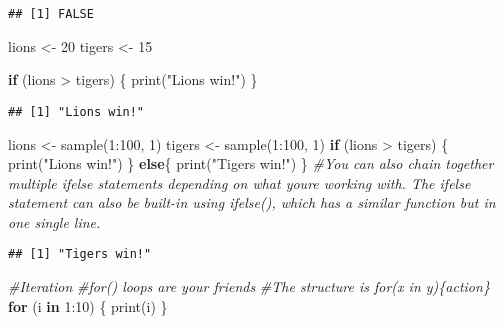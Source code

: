 \documentclass[
]{article}
\newenvironment{Shaded}{\begin{snugshade}}{\end{snugshade}}
\newcommand{\CommentTok}[1]{\textcolor[rgb]{0.56,0.35,0.01}{\textit{#1}}}
\newcommand{\ControlFlowTok}[1]{\textcolor[rgb]{0.13,0.29,0.53}{\textbf{#1}}}
\newcommand{\DecValTok}[1]{\textcolor[rgb]{0.00,0.00,0.81}{#1}}
\newcommand{\FunctionTok}[1]{\textcolor[rgb]{0.00,0.00,0.00}{#1}}
\newcommand{\NormalTok}[1]{#1}
\newcommand{\OtherTok}[1]{\textcolor[rgb]{0.56,0.35,0.01}{#1}}
\newcommand{\SpecialCharTok}[1]{\textcolor[rgb]{0.00,0.00,0.00}{#1}}
\newcommand{\StringTok}[1]{\textcolor[rgb]{0.31,0.60,0.02}{#1}}
\begin{document}
\begin{verbatim}
## [1] FALSE
\end{verbatim}

\begin{Shaded}
\begin{Highlighting}[]
\NormalTok{lions }\OtherTok{\textless{}{-}} \DecValTok{20}
\NormalTok{tigers }\OtherTok{\textless{}{-}} \DecValTok{15}

\ControlFlowTok{if}\NormalTok{ (lions }\SpecialCharTok{\textgreater{}}\NormalTok{ tigers) \{}
  \FunctionTok{print}\NormalTok{(}\StringTok{"Lions win!"}\NormalTok{)}
\NormalTok{\}}
\end{Highlighting}
\end{Shaded}

\begin{verbatim}
## [1] "Lions win!"
\end{verbatim}

\begin{Shaded}
\begin{Highlighting}[]
\NormalTok{lions }\OtherTok{\textless{}{-}} \FunctionTok{sample}\NormalTok{(}\DecValTok{1}\SpecialCharTok{:}\DecValTok{100}\NormalTok{, }\DecValTok{1}\NormalTok{)}
\NormalTok{tigers }\OtherTok{\textless{}{-}} \FunctionTok{sample}\NormalTok{(}\DecValTok{1}\SpecialCharTok{:}\DecValTok{100}\NormalTok{, }\DecValTok{1}\NormalTok{)}
\ControlFlowTok{if}\NormalTok{ (lions }\SpecialCharTok{\textgreater{}}\NormalTok{ tigers) \{}
  \FunctionTok{print}\NormalTok{(}\StringTok{"Lions win!"}\NormalTok{)}
\NormalTok{\} }\ControlFlowTok{else}\NormalTok{\{}
  \FunctionTok{print}\NormalTok{(}\StringTok{"Tigers win!"}\NormalTok{)}
\NormalTok{\} }\CommentTok{\#You can also chain together multiple ifelse statements depending on what you\textquotesingle{}re working with. The ifelse statement can also be built{-}in using ifelse(), which has a similar function but in one single line.}
\end{Highlighting}
\end{Shaded}

\begin{verbatim}
## [1] "Tigers win!"
\end{verbatim}

\begin{Shaded}
\begin{Highlighting}[]
\CommentTok{\#Iteration}
\CommentTok{\#for() loops are your friends}
\CommentTok{\#The structure is for(x in y)\{action\}}
\ControlFlowTok{for}\NormalTok{ (i }\ControlFlowTok{in} \DecValTok{1}\SpecialCharTok{:}\DecValTok{10}\NormalTok{) \{}
  \FunctionTok{print}\NormalTok{(i)}
\NormalTok{\}}
\end{Highlighting}
\end{Shaded}
\end{document}
